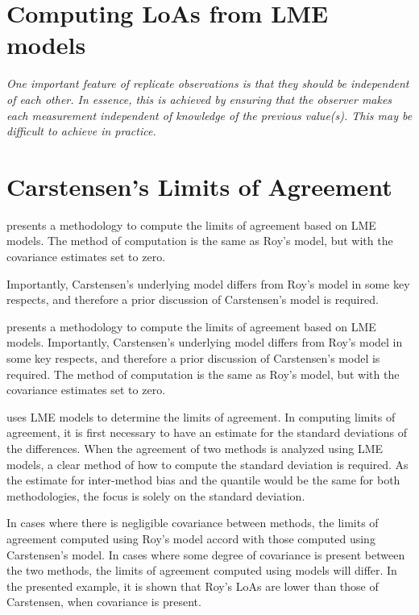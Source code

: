 \documentclass[12pt, a4paper]{report}
\theoremstyle{plain}
\theoremstyle{definition}
\theoremstyle{remark}
\begin{document}
\section{Computing LoAs from LME models}



\emph{
	One important feature of replicate observations is that they should be independent
	of each other. In essence, this is achieved by ensuring that the observer makes each
	measurement independent of knowledge of the previous value(s). This may be difficult
	to achieve in practice.}

	
	
\section{Carstensen's Limits of Agreement}
\citet{BXC2008} presents a methodology to compute the limits of agreement based on LME models. The method of computation is the same as Roy's model, but with the covariance estimates set to zero.

Importantly, Carstensen's underlying model differs from Roy's model in some key respects, and therefore a prior discussion of Carstensen's model is required.

\bigskip

	\citet{BXC2008} presents a methodology to compute the limits of
	agreement based on LME models. Importantly, Carstensen's underlying model differs from Roy's model in some key respects, and therefore a prior discussion of Carstensen's model is required.
	The method of computation is the same as Roy's model, but with the covariance estimates set to zero.
	
	\citet{BXC2008} uses LME models to determine the limits of agreement.  In computing limits of agreement, it is first necessary to have an estimate for the standard deviations of the differences. When the agreement of two methods is analyzed using LME models, a clear method of how to compute the standard deviation is required. As the estimate for inter-method bias and the quantile would be the same for both methodologies, the focus is solely on the standard deviation.
	
	
	
	In cases where there is negligible covariance between methods, the limits of agreement computed using Roy's model accord with those computed using Carstensen's model. In cases where some degree of
	covariance is present between the two methods, the limits of agreement computed using models will differ. In the presented example, it is shown that Roy's LoAs are lower than those of Carstensen, when covariance is present.
	
\end{document}
